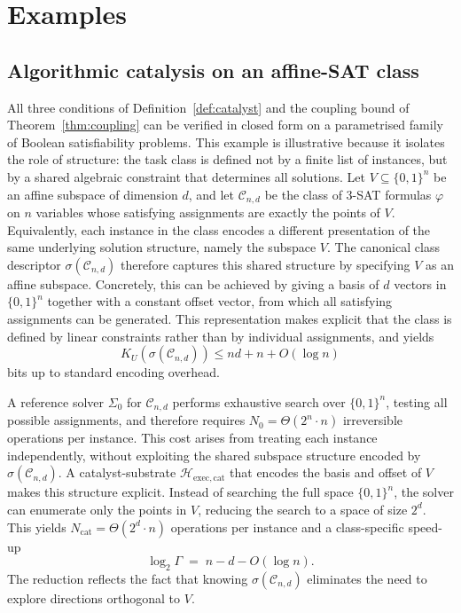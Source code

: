 \documentclass[runningheads]{llncs}
\newcommand{\Sys}{\Sigma}
\newcommand{\Nop}{N}
\newcommand{\Hw}{\mathcal{H}}
\newcommand{\Class}{\mathcal{C}}
\begin{document}
\section{Examples}
\label{sec:examples}
\subsection{Algorithmic catalysis on an affine-SAT class}
\label{sec:affine-sat}

All three conditions of Definition~\ref{def:catalyst} and the
coupling bound of Theorem~\ref{thm:coupling} can be verified in
closed form on a parametrised family of Boolean satisfiability
problems. This example is illustrative because it isolates the role of
structure: the task class is defined not by a finite list of
instances, but by a shared algebraic constraint that determines all
solutions. Let $V\subseteq\{0,1\}^n$ be an affine subspace of dimension $d$, and let $\Class_{n,d}$ be the class of $3$-SAT formulas $\varphi$ on
$n$ variables whose satisfying assignments are exactly the points
of $V$. Equivalently, each instance in the class encodes a different
presentation of the same underlying solution structure, namely the
subspace $V$. The canonical class descriptor
$\sigma(\Class_{n,d})$ therefore captures this shared structure by
specifying $V$ as an affine subspace. Concretely, this can be
achieved by giving a basis of $d$ vectors in $\{0,1\}^n$ together
with a constant offset vector, from which all satisfying assignments
can be generated. This representation makes explicit that the class
is defined by linear constraints rather than by individual
assignments, and yields
\[
K_U(\sigma(\Class_{n,d}))\le n d+n+O(\log n)
\]
bits up to standard encoding overhead.

A reference solver $\Sys_0$ for $\Class_{n,d}$ performs exhaustive
search over $\{0,1\}^n$, testing all possible assignments, and
therefore requires $\Nop_0=\Theta(2^n\cdot n)$ irreversible
operations per instance. This cost arises from treating each
instance independently, without exploiting the shared subspace
structure encoded by $\sigma(\Class_{n,d})$. A catalyst-substrate $\Hw_{\mathrm{exec,cat}}$ that encodes the
basis and offset of $V$ makes this structure explicit. Instead of
searching the full space $\{0,1\}^n$, the solver can enumerate only
the points in $V$, reducing the search to a space of size $2^d$.
This yields $\Nop_{\mathrm{cat}}=\Theta(2^d\cdot n)$ operations per
instance and a class-specific speed-up
\begin{equation}
\log_2\Gamma\;=\;n-d-O(\log n).
\end{equation}
The reduction reflects the fact that knowing $\sigma(\Class_{n,d})$
eliminates the need to explore directions orthogonal to $V$.
\end{document}
